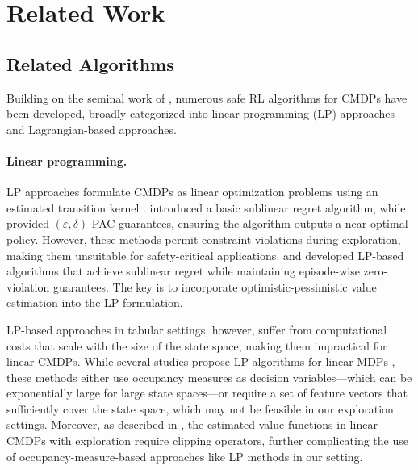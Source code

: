 \section{Related Work}\label{sec:related work}

\subsection{Related Algorithms}
Building on the seminal work of \citet{efroni2020exploration}, numerous safe RL algorithms for CMDPs have been developed, broadly categorized into linear programming (LP) approaches and Lagrangian-based approaches.

\paragraph{Linear programming.}
LP approaches formulate CMDPs as linear optimization problems using an estimated transition kernel \citep{altman1999constrained}.
\citet{efroni2020exploration} introduced a basic sublinear regret algorithm, while \citet{hasanzadezonuzy2021learning} provided $(\varepsilon,\delta)$-PAC guarantees, ensuring the algorithm outputs a near-optimal policy.
However, these methods permit constraint violations during exploration, making them unsuitable for safety-critical applications.
\citet{liu2021learning} and \citet{bura2022dope} developed LP-based algorithms that achieve sublinear regret while maintaining episode-wise zero-violation guarantees. 
The key is to incorporate optimistic-pessimistic value estimation into the LP formulation.

LP-based approaches in tabular settings, however, suffer from computational costs that scale with the size of the state space, making them impractical for linear CMDPs. 
While several studies propose LP algorithms for linear MDPs \citep{neu2020unifying,bas2021logistic,neu2023efficient,lakshminarayanan2017linearly,gabbianelli2024offline}, these methods either use occupancy measures as decision variables---which can be exponentially large for large state spaces---or require a set of feature vectors that sufficiently cover the state space, which may not be feasible in our exploration settings.
Moreover, as described in , the estimated value functions in linear CMDPs with exploration require clipping operators, further complicating the use of occupancy-measure-based approaches like LP methods in our setting.

